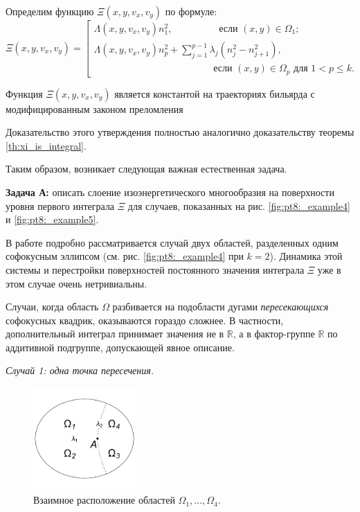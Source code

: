 Определим функцию $\Xi(x, y, v_x, v_y)$ по формуле: 
\begin{equation*}
\Xi(x, y, v_x, v_y) = \left[
\begin{array}{ll}
    \Lambda(x, y, v_x, v_y) n_1^2, \qquad  \ \ \qquad   \text{ если } (x,y) \in \Omega_1 ;
    \\
    \Lambda(x, y, v_x, v_y) n_p^2 + \sum_{j=1}^{p-1} \lambda_j(n_j^2-n_{j+1}^2), \\
     \qquad \qquad \qquad \qquad \qquad \qquad  \text{ если } (x,y) \in \Omega_p \text{ для } 1 < p \leq k. 
\end{array}
\right.
\end{equation*}

\begin{theorem}
Функция $\Xi(x, y, v_x, v_y)$ является константой на траекториях бильярда с модифицированным законом  преломления
\end{theorem}
Доказательство этого утверждения полностью аналогично доказательству теоремы \ref{th:xi_is_integral}.

Таким образом, возникает следующая важная естественная задача.

\textbf{Задача А:} описать слоение изоэнергетического многообразия на поверхности уровня первого интеграла $\Xi$ для случаев, показанных на рис. \ref{fig:pt8:_example4} и \ref{fig:pt8:_example5}. 

В работе подробно рассматривается случай двух областей, разделенных одним софокусным эллипсом (см. рис. \ref{fig:pt8:_example4} при $k=2$). Динамика этой системы и перестройки поверхностей постоянного значения интеграла $\Xi$ уже в этом случае очень нетривиальны.
\bigskip

Случаи, когда область $\Omega$ разбивается на подобласти дугами \textit{пересекающихся} софокусных квадрик, оказываются гораздо сложнее. В частности, дополнительный интеграл принимает значения не в $\mathbb{R}$, а в фактор-группе $\mathbb{R}$ по  аддитивной подгруппе, допускающей явное описание.


\textit{ Случай 1: одна точка пересечения. }

\begin{figure}[!htb]
\centering
     \includegraphics[width=0.35\textwidth]{images/ch4/section1/img2.pdf}
\caption{Взаимное расположение областей $\Omega_1,\ldots,\Omega_4$.}
    \label{fig:pt8:_example6}
\end{figure}

